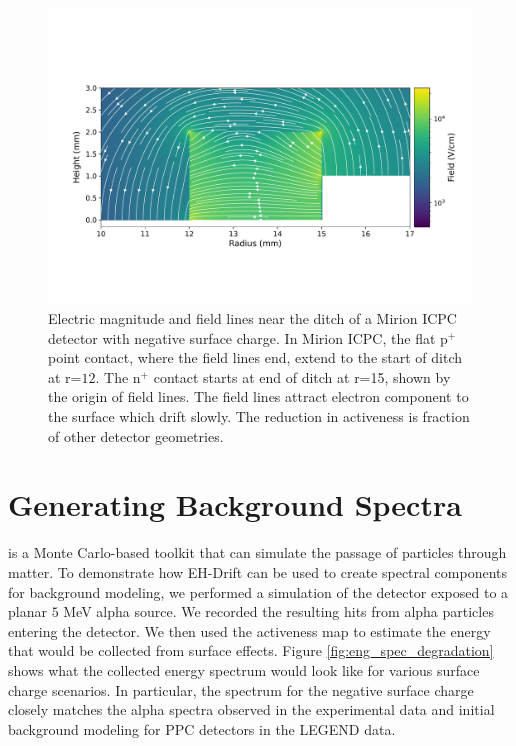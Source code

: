\begin{figure}%
\centering
\includegraphics[trim={1cm 3cm 0cm 4.69cm},clip,width=0.99\linewidth]{ch5/figs/elect_field_lines_surface_V07647A_sc_-0.3.pdf}
\caption{Electric magnitude and field lines near the ditch of a Mirion ICPC detector with negative surface charge. In Mirion ICPC, the flat p$^+$ point contact, where the field lines end, extend to the start of ditch at r=$12$. The n$^+$ contact starts at end of ditch at r=15, shown by the origin of field lines. The field lines attract electron component to the surface which drift slowly. The reduction in activeness is fraction of other detector geometries.}
\label{ch5_fig_elect_field_lines_surface_V07647A}
\end{figure}


\section{\label{res:3} Generating Background Spectra}
{\geant} is a Monte Carlo-based toolkit that can simulate the passage of particles through matter. To demonstrate how EH-Drift can be used to create spectral components for background modeling, we performed a {\geant} simulation of the {\ponama} detector exposed to a planar $5$ MeV alpha source. We recorded the resulting hits from alpha particles entering the detector. We then used the activeness map to estimate the energy that would be collected from surface effects. Figure \ref{fig:eng_spec_degradation} shows what the collected energy spectrum would look like for various surface charge scenarios. In particular, the spectrum for the negative surface charge closely matches the alpha spectra observed in the {\MJD} experimental data and initial background modeling for PPC detectors in the LEGEND data.

